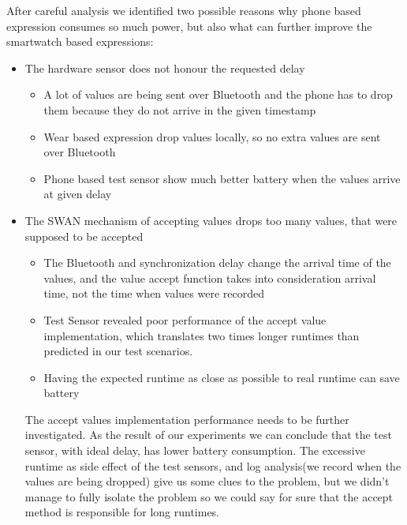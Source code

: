 After careful analysis we identified two possible reasons why phone based expression consumes so much power, but also what can further improve the smartwatch based expressions:
\begin{itemize}
 \item The hardware sensor does not honour the requested delay
 \begin{itemize}
  \item A lot of values are being sent over Bluetooth and the phone has to drop them because they do not arrive in the given timestamp
  \item Wear based expression drop values locally, so no extra values are sent over Bluetooth
  \item Phone based test sensor show much better battery when the values arrive at given delay
 \end{itemize}
 \item The SWAN mechanism of accepting values drops too many values, that were supposed to be accepted
 \begin{itemize}
  \item The Bluetooth and synchronization delay change the arrival time of the values, and the value accept function takes into consideration arrival time, not the time when values were recorded
  \item Test Sensor revealed poor performance of the accept value implementation, which translates two times longer runtimes than predicted in our test scenarios.
  \item Having the expected runtime as close as possible to real runtime can save battery
 \end{itemize}

 The accept values implementation performance needs to be further investigated.
 As the result of our experiments we can conclude that the test sensor, with ideal delay, has lower battery consumption.
 The excessive runtime as side effect of the test sensors, and log analysis(we record when the values are being dropped) give us some clues to the problem, but we didn't manage to fully isolate the
 problem so we could say for sure that the accept method is responsible for long runtimes.

\end{itemize}
